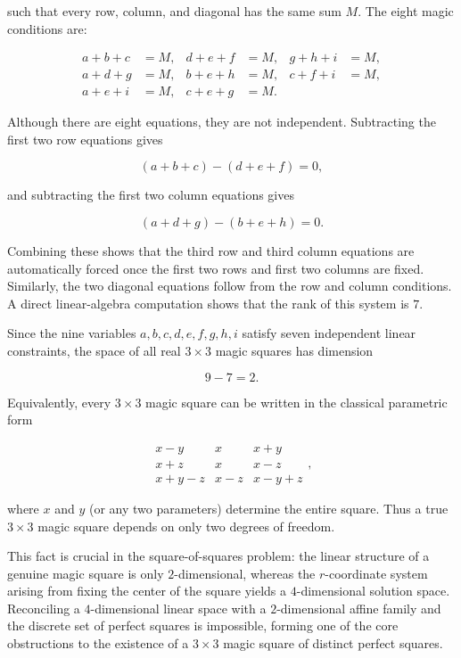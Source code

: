 \documentclass[12pt]{article}
\begin{document}
such that every row, column, and diagonal has the same sum $M$.  The eight
magic conditions are:


\[
\begin{aligned}
a+b+c &= M, & d+e+f &= M, & g+h+i &= M,\\
a+d+g &= M, & b+e+h &= M, & c+f+i &= M,\\
a+e+i &= M, & c+e+g &= M.
\end{aligned}
\]



Although there are eight equations, they are not independent.  Subtracting the
first two row equations gives


\[
(a+b+c)-(d+e+f)=0,
\]


and subtracting the first two column equations gives


\[
(a+d+g)-(b+e+h)=0.
\]


Combining these shows that the third row and third column equations are
automatically forced once the first two rows and first two columns are fixed.
Similarly, the two diagonal equations follow from the row and column
conditions.  A direct linear-algebra computation shows that the rank of this
system is $7$.

Since the nine variables $a,b,c,d,e,f,g,h,i$ satisfy seven independent linear
constraints, the space of all real $3\times 3$ magic squares has dimension


\[
9 - 7 = 2.
\]



Equivalently, every $3\times 3$ magic square can be written in the classical
parametric form


\[
\begin{matrix}
x-y & x & x+y \\
x+z & x & x-z \\
x+y-z & x-z & x-y+z
\end{matrix},
\]


where $x$ and $y$ (or any two parameters) determine the entire square.  Thus a
true $3\times 3$ magic square depends on only two degrees of freedom.

This fact is crucial in the square-of-squares problem: the linear structure of
a genuine magic square is only $2$-dimensional, whereas the $r$-coordinate
system arising from fixing the center of the square yields a $4$-dimensional
solution space.  Reconciling a $4$-dimensional linear space with a
$2$-dimensional affine family and the discrete set of perfect squares is
impossible, forming one of the core obstructions to the existence of a
$3\times 3$ magic square of distinct perfect squares.
\end{document}
